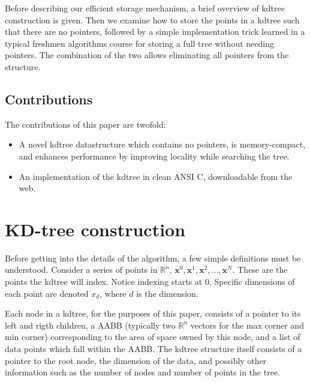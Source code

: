 \documentclass[journal]{IEEEtran}
\newcommand{\x}{\mathbf{x}}
\begin{document}
Before describing our efficient storage mechanism, a brief overview of kdtree
construction is given. Then we examine how to store the points in a kdtree such
that there are no pointers, followed by a simple implementation trick learned
in a typical freshmen algorithms course for storing a full tree without needing
pointers.  The combination of the two allows eliminating all pointers from the
structure.

\subsection{Contributions}
The contributions of this paper are twofold:
\begin{itemize}
    \item A novel kdtree datastructure which contains no pointers, is
    memory-compact, and enhances performance by improving locality while
    searching the tree.
    \item An implementation of the kdtree in clean ANSI C, downloadable from
    the web.
\end{itemize}
 
\section{KD-tree construction}
Before getting into the details of the algorithm, a few simple definitions must
be understood.  Consider a series of points in $\mathbb{R}^n$,
$\x^0,\x^1,\x^2,...,\x^N$. These are the points the kdtree will index.  Notice
indexing starts at 0.  Specific dimensions of each point are denoted $x_d$,
where $d$ is the dimension.

Each node in a kdtree, for the purposes of this paper, consists of a pointer to
its left and rigth children, a AABB (typically two $\mathbb{R}^n$ vectors for
the max corner and min corner) corresponding to the area of space owned by this
node, and a list of data points which fall within the AABB. The kdtree
structure itself consists of a pointer to the root node, the dimension of the
data, and possibly other information such as the number of nodes and number of
points in the tree.
\end{document}
